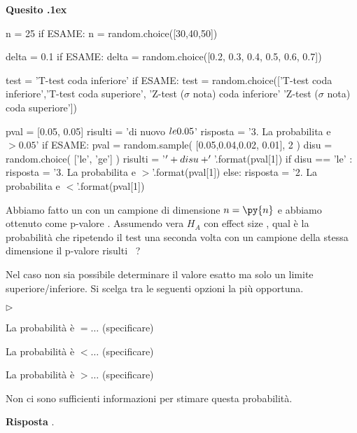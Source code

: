 \documentclass[11pt,twoside,a4paper]{article}
\newcommand{\mylabel}[1]{#1\hfill}
\renewenvironment{itemize}
  {\begin{list}{$\triangleright$}{%
   \setlength{\parskip}{0mm}
   \setlength{\topsep}{.4\baselineskip}
   \setlength{\rightmargin}{0mm}
   \setlength{\listparindent}{0mm}
   \setlength{\itemindent}{0mm}
   \setlength{\labelwidth}{2ex}
   \setlength{\itemsep}{.4\baselineskip}
   \setlength{\parsep}{0mm}
   \setlength{\partopsep}{0mm}
   \setlength{\labelsep}{1ex}
   \setlength{\leftmargin}{\labelwidth+\labelsep}
   \let\makelabel\mylabel}}{%
   \end{list}\vspace*{-1.3mm}}
\newcounter{quesito}
\newenvironment{xquestion}{\bigskip\addtocounter{quesito}{1}\par\textbf{Quesito \thequesito.\kern1ex}}{\vspace{\parskip}}
\newenvironment{answer}{\par\textbf{Risposta\quad}}{\vspace{\parskip}}
\begin{document}
\begin{xquestion} %
\begin{pycode}
n = 25
if ESAME: n = random.choice([30,40,50])

delta = 0.1
if ESAME: delta = random.choice([0.2, 0.3, 0.4, 0.5, 0.6, 0.7])

test = 'T-test coda inferiore'
if ESAME: test = random.choice(['T-test coda inferiore','T-test coda superiore', 'Z-test ($\sigma$ nota) coda inferiore' 'Z-test ($\sigma$ nota) coda superiore'])

pval = [0.05, 0.05]
risulti = 'di nuovo $\\le 0.05$'
risposta = '3. La probabilita e $>0.05$'
if ESAME: 
   pval = random.sample( [0.05,0.04,0.02, 0.01], 2 )
   disu = random.choice( ['le', 'ge'] ) 
   risulti = '$\\' + disu + '{}$'.format(pval[1])
   if disu == 'le' :
      risposta = '3. La probabilita e $>{}$'.format(pval[1])
   else:
      risposta = '2. La probabilita e $<{}$'.format(pval[1])
\end{pycode}
Abbiamo fatto un  con un campione di dimensione $n=\py{n}$ e abbiamo ottenuto come p-valore .
Assumendo vera $H_A$ con effect size , qual è la probabilità che ripetendo il test una seconda volta con un campione della stessa dimensione il p-valore risulti ~?

Nel caso non sia possibile determinare il valore esatto ma solo un limite superiore/inferiore. Si scelga tra le seguenti opzioni la più opportuna.
\begin{itemize}
\item[1.] La probabilità è $=\dots$ (specificare)
\item[2.] La probabilità è $<\dots$ (specificare)
\item[3.] La probabilità è $>\dots$ (specificare)
\item[4.] Non ci sono sufficienti informazioni per stimare questa probabilità.
\end{itemize}
\begin{answer}
{\color{blue}.}
\end{answer}
\end{xquestion}


\clearpage
\end{document}
